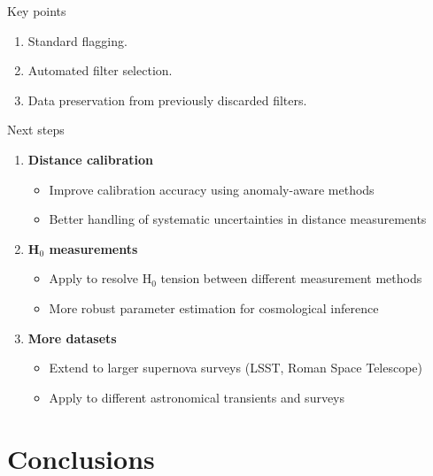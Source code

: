 \documentclass[aspectratio=169]{beamer}
\begin{document}
\begin{frame}{Key points}
  \begin{enumerate}
    \item Standard flagging.
    \item Automated filter selection.
    \item Data preservation from previously discarded filters.
  \end{enumerate}
\end{frame}

\begin{frame}{Next steps}
  \begin{enumerate}
    \item \textbf{Distance calibration}
      \begin{itemize}
        \item Improve calibration accuracy using anomaly-aware methods
        \item Better handling of systematic uncertainties in distance measurements
      \end{itemize}
    \item \textbf{H$_0$ measurements}
      \begin{itemize}
        \item Apply to resolve H$_0$ tension between different measurement methods
        \item More robust parameter estimation for cosmological inference
      \end{itemize}
    \item \textbf{More datasets}
      \begin{itemize}
        \item Extend to larger supernova surveys (LSST, Roman Space Telescope)
        \item Apply to different astronomical transients and surveys
      \end{itemize}
  \end{enumerate}
\end{frame}

\section{Conclusions}
\end{document}
